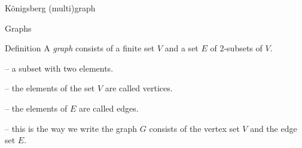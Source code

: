 \begin{frame}{K{\"o}nigsberg (multi)graph}
  \vspace{10mm}
  \begin{adjustbox}{max width={0.9\textwidth},center} 
  \end{adjustbox}
\end{frame}

\begin{frame}{Graphs}
  \begin{alertblock}{Definition}
  A \emph{graph} consists of a finite set $V$ and a set $E$ of 2-subsets of $V$.
  \end{alertblock}
  \vspace{4mm}
  \begin{description}
    \setlength\itemsep{3mm}
    \item[$2$-subset] -- a subset with two elements.
    \item[Vertices] -- the elements of the set $V$ are called vertices.
    \item[Edges] -- the elements of $E$ are called edges.
    \item[$G = (V,E)$] -- this is the way we write the graph $G$ consists of the vertex set $V$ and the edge set $E$.
  \end{description}
\end{frame}


